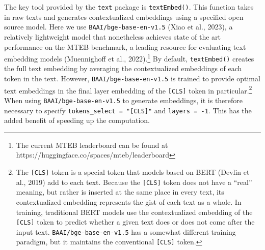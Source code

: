 \documentclass[
  man,
  floatsintext,
  longtable,
  nolmodern,
  notxfonts,
  notimes,
  colorlinks=true,linkcolor=blue,citecolor=blue,urlcolor=blue]{apa7}
\newenvironment{Shaded}{\begin{snugshade}}{\end{snugshade}}
\newcommand{\AttributeTok}[1]{\textcolor[rgb]{0.40,0.45,0.13}{#1}}
\newcommand{\CommentTok}[1]{\textcolor[rgb]{0.37,0.37,0.37}{#1}}
\newcommand{\DecValTok}[1]{\textcolor[rgb]{0.68,0.00,0.00}{#1}}
\newcommand{\FunctionTok}[1]{\textcolor[rgb]{0.28,0.35,0.67}{#1}}
\newcommand{\NormalTok}[1]{\textcolor[rgb]{0.00,0.23,0.31}{#1}}
\newcommand{\OtherTok}[1]{\textcolor[rgb]{0.00,0.23,0.31}{#1}}
\newcommand{\SpecialCharTok}[1]{\textcolor[rgb]{0.37,0.37,0.37}{#1}}
\newcommand{\StringTok}[1]{\textcolor[rgb]{0.13,0.47,0.30}{#1}}
\begin{document}
The key tool provided by the \texttt{text} package is
\texttt{textEmbed()}. This function takes in raw texts and generates
contextualized embeddings using a specified open source model. Here we
use \texttt{BAAI/bge-base-en-v1.5} (Xiao et al., 2023), a relatively
lightweight model that nonetheless achieves state of the art performance
on the MTEB benchmark, a leading resource for evaluating text embedding
models (Muennighoff et al., 2022).\footnote{The current MTEB leaderboard
  can be found at https://huggingface.co/spaces/mteb/leaderboard} By
default, \texttt{textEmbed()} creates the full text embedding by
averaging the contextualized embeddings of each token in the text.
However, \texttt{BAAI/bge-base-en-v1.5} is trained to provide optimal
text embeddings in the final layer embedding of the \texttt{{[}CLS{]}}
token in particular.\footnote{The \texttt{{[}CLS{]}} token is a special
  token that models based on BERT (Devlin et al., 2019) add to each
  text. Because the \texttt{{[}CLS{]}} token does not have a ``real''
  meaning, but rather is inserted at the same place in every text, its
  contextualized embedding represents the gist of each text as a whole.
  In training, traditional BERT models use the contextualized embedding
  of the \texttt{{[}CLS{]}} token to predict whether a given text does
  or does not come after the input text. \texttt{BAAI/bge-base-en-v1.5}
  has a somewhat different training paradigm, but it maintains the
  conventional \texttt{{[}CLS{]}} token.} When using
\texttt{BAAI/bge-base-en-v1.5} to generate embeddings, it is therefore
necessary to specify \texttt{tokens\_select\ =\ "{[}CLS{]}"} and
\texttt{layers\ =\ -1}. This has the added benefit of speeding up the
computation.

\begin{Shaded}
\end{Shaded}
\end{document}
